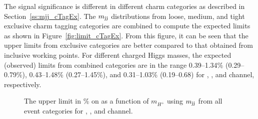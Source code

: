 The signal significance is different in different charm categories as described in 
Section~\ref{ss:mjj_cTagEx}. The $m_\text{jj}$ distributions from loose, medium, and tight 
exclusive charm tagging categories are combined to compute the expected limits as shown in 
Figure~\ref{fig:limit_cTagEx}. From this figure, it can be seen that the upper limits
from exclusive categories are better compared to that obtained from inclusive working points.
For different charged Higgs masses, the expected (observed) limits from combined categories are 
in the range 0.39--1.34\% (0.29--0.79\%), 0.43--1.48\% (0.27--1.45\%), and 0.31--1.03\% (0.19--0.68)
for \mujets, \ejets, and \ljets channel, respectively.

\begin{figure}
    \centering  
    \vfil
    \caption{The upper limit in \% on \brThb as a function of $m_{H^{+}}$ using $m_\text{jj}$ from 
	all event categories for \mujets, \ejets, and \ljets channel.}
\label{fig:finalLimit}
\end{figure}

